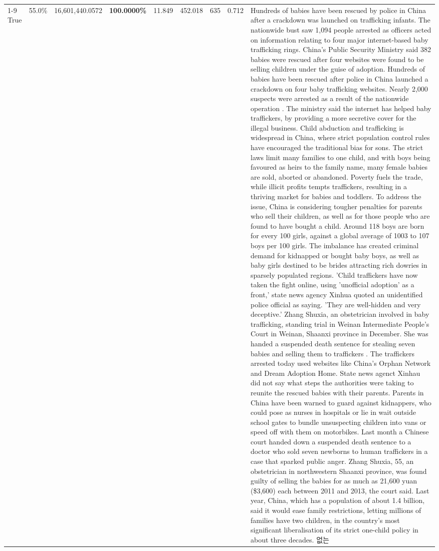 \begin{table}[H]
\begin{tabular}{lllrlllll}
\cline{1-9}
True & 55.0\% & 16,601,440.0572 & \bfseries \color{red} 100.0000\% & 11.849 & 452.018 & 635 & 0.712 & Hundreds of babies have been rescued by police in China after a crackdown was launched on trafficking infants. The nationwide bust saw 1,094 people arrested as officers acted on information relating to four major internet-based baby trafficking rings. China's Public Security Ministry said 382 babies were rescued after four websites were found to be selling children under the guise of adoption. Hundreds of babies have been rescued after police in China launched a crackdown on four baby trafficking websites. Nearly 2,000 suspects were arrested as a result of the nationwide operation . The ministry said the internet has helped baby traffickers, by providing a more secretive cover for the illegal business. Child abduction and trafficking is widespread in China, where strict population control rules have encouraged the traditional bias for sons. The strict laws limit many families to one child, and with boys being favoured as heirs to the family name, many female babies are sold, aborted or abandoned. Poverty fuels the trade, while illicit profits tempts traffickers, resulting in a thriving market for babies and toddlers. To address the issue, China is considering tougher penalties for parents who sell their children, as well as for those people who are found to have bought a child. Around 118 boys are born for every 100 girls, against a global average of 1003 to 107 boys per 100 girls. The imbalance has created criminal demand for kidnapped or bought baby boys, as well as baby girls destined to be brides attracting rich dowries in sparsely populated regions. 'Child traffickers have now taken the fight online, using 'unofficial adoption' as a front,' state news agency Xinhua quoted an unidentified police official as saying. 'They are well-hidden and very deceptive.' Zhang Shuxia, an obstetrician involved in baby trafficking, standing trial in Weinan Intermediate People's Court in Weinan, Shaanxi province in December. She was handed a suspended death sentence for stealing seven babies and selling them to traffickers . The traffickers arrested today used websites like China's Orphan Network and Dream Adoption Home. State news agenct Xinhau did not say what steps the authorities were taking to reunite the rescued babies with their parents. Parents in China have been warned to guard against kidnappers, who could pose as nurses in hospitals or lie in wait outside school gates to bundle unsuspecting children into vans or speed off with them on motorbikes. Last month a Chinese court handed down a suspended death sentence to a doctor who sold seven newborns to human traffickers in a case that sparked public anger. Zhang Shuxia, 55, an obstetrician in northwestern Shaanxi province, was found guilty of selling the babies for as much as 21,600 yuan (\$3,600) each between 2011 and 2013, the court said. Last year, China, which has a population of about 1.4 billion, said it would ease family restrictions, letting millions of families have two children, in the country's most significant liberalisation of its strict one-child policy in about three decades. 없는 \\

\end{tabular}
\end{table}
